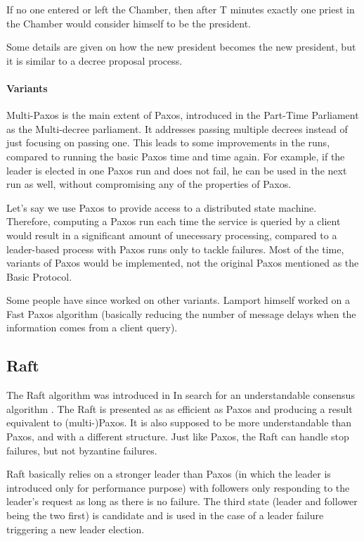 \documentclass[11pt, twocolumn]{article}
\begin{document}
\begin{displayquote}
    If no one entered or left the Chamber, then after T minutes exactly one priest in the Chamber would consider himself to be the president.
\end{displayquote}

Some details are given on how the new president becomes the new president, but it is similar to a decree proposal process.

\paragraph{Variants}

Multi-Paxos is the main extent of Paxos, introduced in the Part-Time Parliament as the Multi-decree parliament.
It addresses passing multiple decrees instead of just focusing on passing one. This leads to some improvements in the runs, compared to running the basic Paxos time and time again.
For example, if the leader is elected in one Paxos run and does not fail, he can be used in the next run as well, without compromising any of the properties of Paxos.

Let's say we use Paxos to provide access to a distributed state machine.
Therefore, computing a Paxos run each time the service is queried by a client would result in a significant amount of unecessary processing, compared to a leader-based process with Paxos runs only to tackle failures.
Most of the time, variants of Paxos would be implemented, not the original Paxos mentioned as the Basic Protocol.

Some people have since worked on other variants. Lamport himself worked on a Fast Paxos algorithm \cite{fastpaxos} (basically reducing the number of message delays when the information comes from a client query).


\subsection{Raft}

The Raft algorithm was introduced in In search for an understandable consensus algorithm \cite{understandable}.
The Raft is presented as as efficient as Paxos and producing a result equivalent to (multi-)Paxos.
It is also supposed to be more understandable than Paxos, and with a different structure. Just like Paxos, the Raft can handle stop failures, but not byzantine failures.

Raft basically relies on a stronger leader than Paxos (in which the leader is introduced only for performance purpose) with followers only responding to the leader's request as long as there is no failure.
The third state (leader and follower being the two first) is candidate and is used in the case of a leader failure triggering a new leader election.
\end{document}
